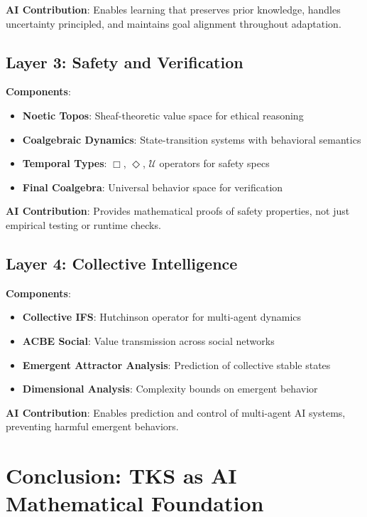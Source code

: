 \documentclass[11pt,twoside]{article}
\theoremstyle{definition}
\theoremstyle{plain}
\theoremstyle{remark}
\begin{document}
\textbf{AI Contribution}: Enables learning that preserves prior knowledge, handles
uncertainty principled, and maintains goal alignment throughout adaptation.

\subsection{Layer 3: Safety and Verification}

\textbf{Components}:
\begin{itemize}
  \item \textbf{Noetic Topos}: Sheaf-theoretic value space for ethical reasoning
  \item \textbf{Coalgebraic Dynamics}: State-transition systems with behavioral semantics
  \item \textbf{Temporal Types}: $\Box$, $\Diamond$, $\mathcal{U}$ operators for safety specs
  \item \textbf{Final Coalgebra}: Universal behavior space for verification
\end{itemize}

\textbf{AI Contribution}: Provides mathematical proofs of safety properties, not just
empirical testing or runtime checks.

\subsection{Layer 4: Collective Intelligence}

\textbf{Components}:
\begin{itemize}
  \item \textbf{Collective IFS}: Hutchinson operator for multi-agent dynamics
  \item \textbf{ACBE Social}: Value transmission across social networks
  \item \textbf{Emergent Attractor Analysis}: Prediction of collective stable states
  \item \textbf{Dimensional Analysis}: Complexity bounds on emergent behavior
\end{itemize}

\textbf{AI Contribution}: Enables prediction and control of multi-agent AI systems,
preventing harmful emergent behaviors.

\section{Conclusion: TKS as AI Mathematical Foundation}
\label{sec:conclusion}
\end{document}
